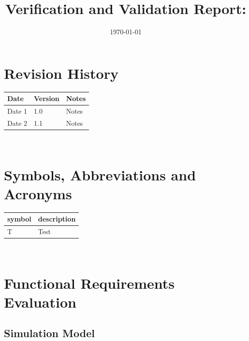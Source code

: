\documentclass[12pt, titlepage]{article}
\begin{document}
\title{Verification and Validation Report: \progname} 
\author{\authname}
\date{\today}
	
\maketitle


\section{Revision History}

\begin{tabularx}{\textwidth}{p{3cm}p{2cm}X}
\toprule {\bf Date} & {\bf Version} & {\bf Notes}\\
\midrule
Date 1 & 1.0 & Notes\\
Date 2 & 1.1 & Notes\\
\bottomrule
\end{tabularx}

~\newpage

\section{Symbols, Abbreviations and Acronyms}

\renewcommand{\arraystretch}{1.2}
\begin{tabular}{l l} 
  \toprule		
  \textbf{symbol} & \textbf{description}\\
  \midrule 
  T & Test\\
  \bottomrule
\end{tabular}\\


\newpage

\tableofcontents

\listoftables %

\listoffigures %

\newpage


\section{Functional Requirements Evaluation}

\subsection{Simulation Model}
\end{document}
